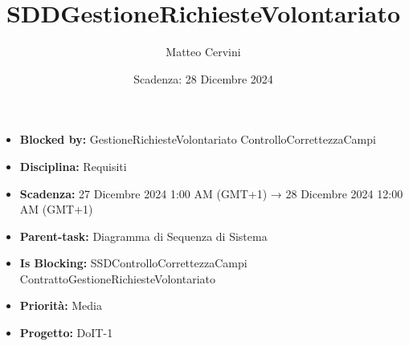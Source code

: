 \title{SDDGestioneRichiesteVolontariato}
\author{Matteo Cervini}
\date{Scadenza: 28 Dicembre 2024}

\maketitle

\begin{itemize}
    \item \textbf{Blocked by:} GestioneRichiesteVolontariato ControlloCorrettezzaCampi
    \item \textbf{Disciplina:} Requisiti
    \item \textbf{Scadenza:} 27 Dicembre 2024 1:00 AM (GMT+1) → 28 Dicembre 2024 12:00 AM (GMT+1)
    \item \textbf{Parent-task:} Diagramma di Sequenza di Sistema
    \item \textbf{Is Blocking:} SSDControlloCorrettezzaCampi ContrattoGestioneRichiesteVolontariato
    \item \textbf{Priorità:} Media 
    \item \textbf{Progetto:} DoIT-1
\end{itemize}